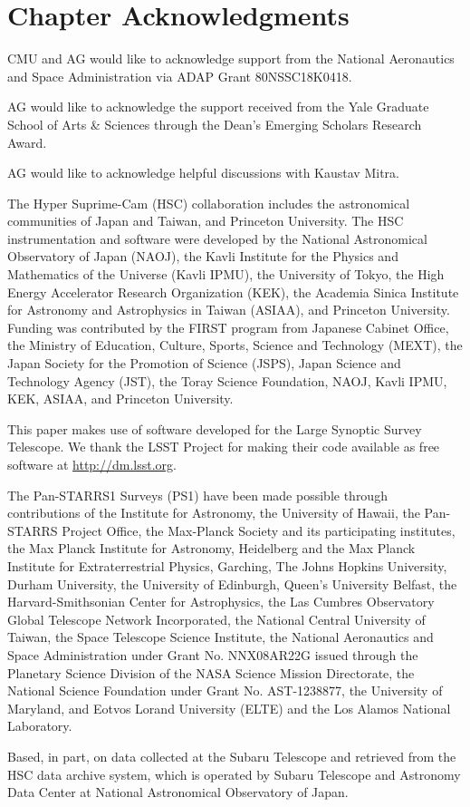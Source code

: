 \section*{Chapter Acknowledgments}

CMU and AG would like to acknowledge support from the National Aeronautics and Space Administration via ADAP Grant 80NSSC18K0418. 

AG would like to acknowledge the support received from the Yale Graduate School of Arts \& Sciences through the Dean's Emerging Scholars Research Award.

AG would like to acknowledge helpful discussions with Kaustav Mitra. 

The Hyper Suprime-Cam (HSC) collaboration includes the astronomical communities of Japan and Taiwan, and Princeton University. The HSC instrumentation and software were developed by the National Astronomical Observatory of Japan (NAOJ), the Kavli Institute for the Physics and Mathematics of the Universe (Kavli IPMU), the University of Tokyo, the High Energy Accelerator Research Organization (KEK), the Academia Sinica Institute for Astronomy and Astrophysics in Taiwan (ASIAA), and Princeton University. Funding was contributed by the FIRST program from Japanese Cabinet Office, the Ministry of Education, Culture, Sports, Science and Technology (MEXT), the Japan Society for the Promotion of Science (JSPS), Japan Science and Technology Agency (JST), the Toray Science Foundation, NAOJ, Kavli IPMU, KEK, ASIAA, and Princeton University. 

This paper makes use of software developed for the Large Synoptic Survey Telescope. We thank the LSST Project for making their code available as free software at  \href{http://dm.lsst.org}{http://dm.lsst.org}.

The Pan-STARRS1 Surveys (PS1) have been made possible through contributions of the Institute for Astronomy, the University of Hawaii, the Pan-STARRS Project Office, the Max-Planck Society and its participating institutes, the Max Planck Institute for Astronomy, Heidelberg and the Max Planck Institute for Extraterrestrial Physics, Garching, The Johns Hopkins University, Durham University, the University of Edinburgh, Queen’s University Belfast, the Harvard-Smithsonian Center for Astrophysics, the Las Cumbres Observatory Global Telescope Network Incorporated, the National Central University of Taiwan, the Space Telescope Science Institute, the National Aeronautics and Space Administration under Grant No. NNX08AR22G issued through the Planetary Science Division of the NASA Science Mission Directorate, the National Science Foundation under Grant No. AST-1238877, the University of Maryland, and Eotvos Lorand University (ELTE) and the Los Alamos National Laboratory.

Based, in part, on data collected at the Subaru Telescope and retrieved from the HSC data archive system, which is operated by Subaru Telescope and Astronomy Data Center at National Astronomical Observatory of Japan.




